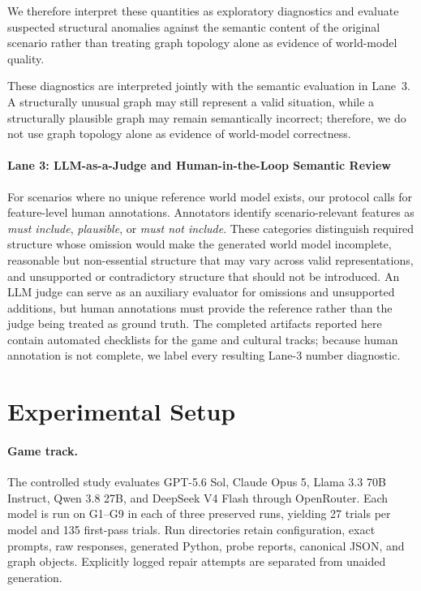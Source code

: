 \documentclass{article}
\begin{document}
We therefore interpret these quantities as exploratory diagnostics and evaluate suspected structural anomalies against the semantic content of the original scenario rather than treating graph topology alone as evidence of world-model quality.

These diagnostics are interpreted jointly with the semantic evaluation in Lane~3. A structurally unusual graph may still represent a valid situation, while a structurally plausible graph may remain semantically incorrect; therefore, we do not use graph topology alone as evidence of world-model correctness.



\paragraph{Lane 3: LLM-as-a-Judge and Human-in-the-Loop Semantic Review}
For scenarios where no unique reference world model exists, our protocol calls for feature-level human annotations. Annotators identify scenario-relevant features as \textit{must include}, \textit{plausible}, or \textit{must not include}. These categories distinguish required structure whose omission would make the generated world model incomplete, reasonable but non-essential structure that may vary across valid representations, and unsupported or contradictory structure that should not be introduced. An LLM judge can serve as an auxiliary evaluator for omissions and unsupported additions, but human annotations must provide the reference rather than the judge being treated as ground truth. The completed artifacts reported here contain automated checklists for the game and cultural tracks; because human annotation is not complete, we label every resulting Lane-3 number diagnostic.

\section{Experimental Setup}
\label{sec:setup}
\paragraph{Game track.} The controlled study evaluates GPT-5.6 Sol, Claude Opus 5, Llama 3.3 70B Instruct, Qwen 3.8 27B, and DeepSeek V4 Flash through OpenRouter. Each model is run on G1--G9 in each of three preserved runs, yielding 27 trials per model and 135 first-pass trials. Run directories retain configuration, exact prompts, raw responses, generated Python, probe reports, canonical JSON, and graph objects. Explicitly logged repair attempts are separated from unaided generation.
\end{document}
